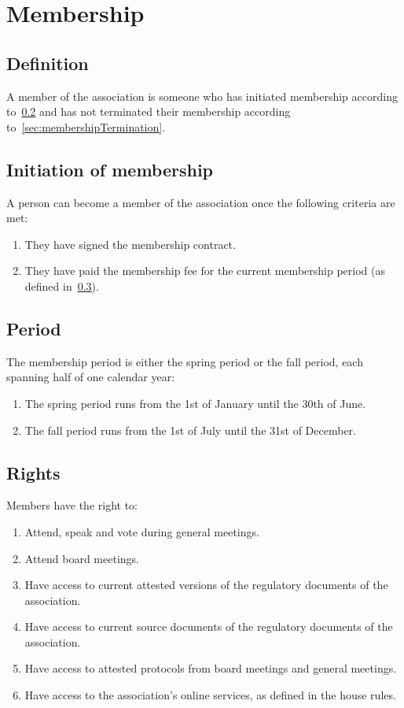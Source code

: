 \section*{Membership}
\subsection{Definition}
A member of the association is someone who has initiated membership according to~\ref{sec:membershipInitiation} 
and has not terminated their membership according to~\ref{sec:membershipTermination}.

\subsection{Initiation of membership}\label{sec:membershipInitiation}
A person can become a member of the association once the following criteria are met:
\begin{enumerate}
  \item They have signed the membership contract. %
  \item They have paid the membership fee for the current membership period (as defined in~\ref{sec:membershipPeriod}).
\end{enumerate}

\subsection{Period} \label{sec:membershipPeriod}
The membership period is either the spring period or the fall period, each spanning half of one calendar year:

\begin{enumerate}
  \item The spring period runs from the 1st of January until the 30th of June.
  \item The fall period runs from the 1st of July until the 31st of December.
\end{enumerate}

\subsection{Rights}
Members have the right to: 
\begin{enumerate}
  \item Attend, speak and vote during general meetings.
  \item Attend board meetings.
  \item Have access to current attested versions of the regulatory documents of the association.
  \item Have access to current source documents of the regulatory documents of the association.
  \item Have access to attested protocols from board meetings and general meetings.
  \item Have access to the association's online services, as defined in the house rules.
\end{enumerate}

